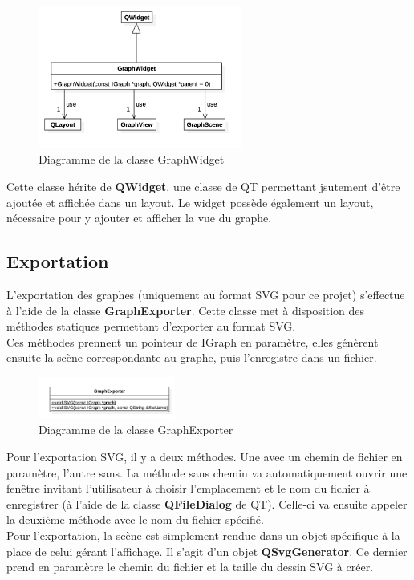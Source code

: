 \documentclass[french]{article}
\begin{document}
			\begin{figure}[H]
				\centering
				\includegraphics[width=0.6\textwidth]{Conception/visualization/graphwidget.png}
				\caption{Diagramme de la classe GraphWidget}
			\end{figure}
			
			Cette classe hérite de \textbf{QWidget}, une classe de QT permettant jsutement d'être ajoutée et affichée dans un layout. Le widget possède également un layout, nécessaire pour y ajouter et afficher la vue du graphe.
		
		\subsection{Exportation}
			L'exportation des graphes (uniquement au format SVG pour ce projet) s'effectue à l'aide de la classe \textbf{GraphExporter}. Cette classe met à disposition des méthodes statiques permettant d'exporter au format SVG. \\
			Ces méthodes prennent un pointeur de IGraph en paramètre, elles génèrent ensuite la scène correspondante au graphe, puis l'enregistre dans un fichier.
			
			\begin{figure}[H]
				\centering
				\includegraphics[width=0.4\textwidth]{Conception/visualization/graphexporter.png}
				\caption{Diagramme de la classe GraphExporter}
			\end{figure}
			
			Pour l'exportation SVG, il y a deux méthodes. Une avec un chemin de fichier en paramètre, l'autre sans. La méthode sans chemin va automatiquement ouvrir une fenêtre invitant l'utilisateur à choisir l'emplacement et le nom du fichier à enregistrer (à l'aide de la classe \textbf{QFileDialog} de QT). Celle-ci va ensuite appeler la deuxième méthode avec le nom du fichier spécifié. \\
			Pour l'exportation, la scène est simplement rendue dans un objet spécifique à la place de celui gérant l'affichage. Il s'agit d'un objet \textbf{QSvgGenerator}. Ce dernier prend en paramètre le chemin du fichier et la taille du dessin SVG à créer. \\
			
\end{document}
